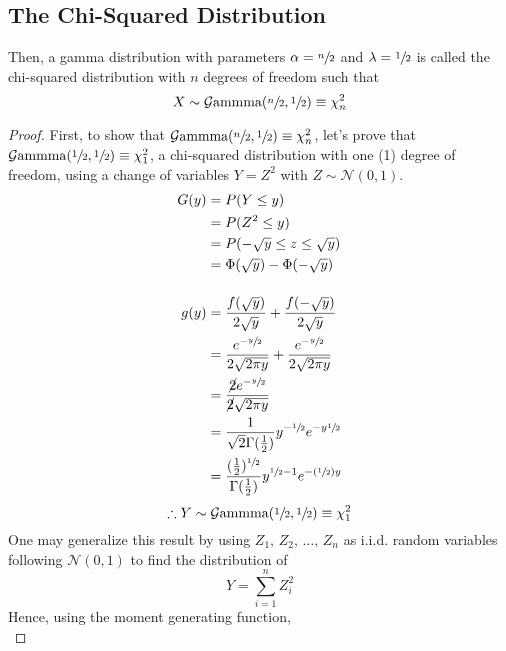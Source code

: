 \documentclass[12pt]{article}
\newcommand{\G}{\mathcal{G}}
\newcommand{\N}{\mathcal{N}}
\begin{document}
\subsection{The Chi-Squared Distribution}\label{subsec:specialcases:chi2}
Then, a gamma distribution with parameters $\alpha=\sfrac{n}{2}$ and $\lambda=\sfrac{1}{2}$ is called the
chi-squared distribution with $n$ degrees of freedom such that
\begin{equation}
	X\sim\G\text{ammma}(\sfrac{n}{2}, \sfrac{1}{2})\equiv\chi^2_n
\end{equation}
\begin{proof}
	First, to show that $\G\text{ammma}(\sfrac{n}{2},\sfrac{1}{2})\equiv\chi^2_n$, let's prove that
	$\G\text{ammma}(\sfrac{1}{2},\sfrac{1}{2})\equiv\chi^2_1$, a chi-squared distribution with one (1) degree of
	freedom, using a change of variables $Y=Z^2$ with $Z\sim\N(0, 1)$.
	\begin{equation}\label{eq:relation:chisquared:1}
		\begin{split}
			G(y)	&=	P(Y\leq y)\\
					&=	P(Z^2\leq y)\\
					&=	P(-\sqrt{y}\leq z \leq \sqrt{y})\\
					&=	\Phi(\sqrt{y})-\Phi(-\sqrt{y})\\[12pt]
			g(y)	&=	\frac{f(\sqrt{y})}{2\sqrt{y}}+\frac{f(-\sqrt{y})}{2\sqrt{y}}\\
					&=	\frac{e^{-\sfrac{y}{2}}}{2\sqrt{2\pi y}} + \frac{e^{-\sfrac{y}{2}}}{2\sqrt{2\pi y}}\\
					&=	\frac{\cancel{2}e^{-\sfrac{y}{2}}}{\cancel{2}\sqrt{2\pi y}}\\
					&=	\frac{1}{\sqrt{2}\Gamma(\frac{1}{2})}y^{-\sfrac{1}{2}}e^{-y\sfrac{1}{2}}\\
					&=	\frac{(\frac{1}{2})^{\sfrac{1}{2}}}{\Gamma(\frac{1}{2})}y^{\sfrac{1}{2}-1}e^{-(\sfrac{1}{2})y}
			\end{split}
	\end{equation}
	\begin{equation}
		\therefore Y\sim\G\text{ammma}(\sfrac{1}{2}, \sfrac{1}{2})\equiv\chi^2_1
	\end{equation}
	One may generalize this result by using $Z_1,\,Z_2,\,\ldots,\,Z_n$ as i.i.d. random variables following $\N(0, 1)$
	to find the distribution of
	\begin{equation}
		Y = \sum^n_{i=1}Z^2_i
	\end{equation}
	Hence, using the moment generating function,
	\begin{equation}\label{eq:relation:chisquared:n}

\end{equation}
\end{proof}
\end{document}
